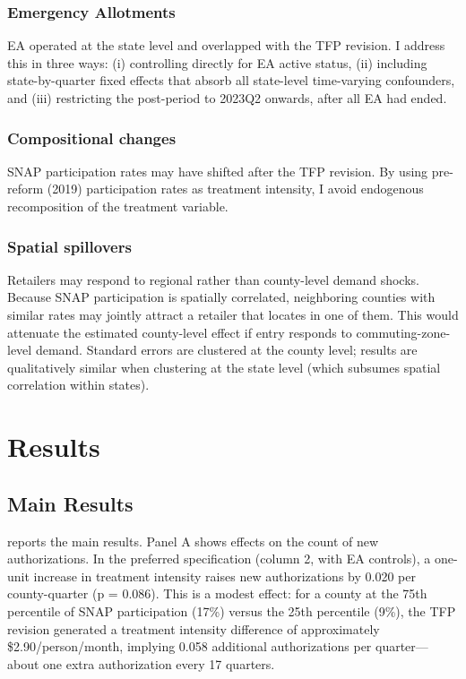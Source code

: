 \documentclass[12pt]{article}
\begin{document}
\subsubsection*{Emergency Allotments}
EA operated at the state level and overlapped with the TFP revision. I address this in three ways: (i) controlling directly for EA active status, (ii) including state-by-quarter fixed effects that absorb all state-level time-varying confounders, and (iii) restricting the post-period to 2023Q2 onwards, after all EA had ended.

\subsubsection*{Compositional changes}
SNAP participation rates may have shifted after the TFP revision. By using pre-reform (2019) participation rates as treatment intensity, I avoid endogenous recomposition of the treatment variable.

\subsubsection*{Spatial spillovers}
Retailers may respond to regional rather than county-level demand shocks. Because SNAP participation is spatially correlated, neighboring counties with similar rates may jointly attract a retailer that locates in one of them. This would attenuate the estimated county-level effect if entry responds to commuting-zone-level demand. Standard errors are clustered at the county level; results are qualitatively similar when clustering at the state level (which subsumes spatial correlation within states).

\section{Results}

\subsection{Main Results}



 reports the main results. Panel A shows effects on the count of new authorizations. In the preferred specification (column 2, with EA controls), a one-unit increase in treatment intensity raises new authorizations by 0.020 per county-quarter (p = 0.086). This is a modest effect: for a county at the 75th percentile of SNAP participation (17\%) versus the 25th percentile (9\%), the TFP revision generated a treatment intensity difference of approximately \$2.90/person/month, implying 0.058 additional authorizations per quarter---about one extra authorization every 17 quarters.
\end{document}
